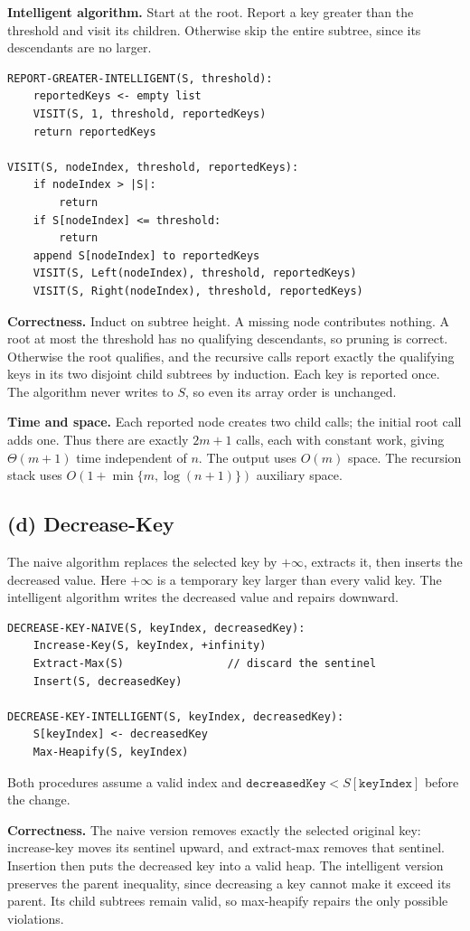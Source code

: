 \documentclass[11pt,a4paper]{article}
\newcommand{\parttitle}[1]{\Needspace{10\baselineskip}\subsection*{#1}}
\begin{document}
\textbf{Intelligent algorithm.} Start at the root. Report a key greater than the threshold and visit its children. Otherwise skip the entire subtree, since its descendants are no larger.
\begin{lstlisting}
REPORT-GREATER-INTELLIGENT(S, threshold):
    reportedKeys <- empty list
    VISIT(S, 1, threshold, reportedKeys)
    return reportedKeys

VISIT(S, nodeIndex, threshold, reportedKeys):
    if nodeIndex > |S|:
        return
    if S[nodeIndex] <= threshold:
        return
    append S[nodeIndex] to reportedKeys
    VISIT(S, Left(nodeIndex), threshold, reportedKeys)
    VISIT(S, Right(nodeIndex), threshold, reportedKeys)
\end{lstlisting}
\textbf{Correctness.} Induct on subtree height. A missing node contributes nothing. A root at most the threshold has no qualifying descendants, so pruning is correct. Otherwise the root qualifies, and the recursive calls report exactly the qualifying keys in its two disjoint child subtrees by induction. Each key is reported once. The algorithm never writes to $S$, so even its array order is unchanged.

\textbf{Time and space.} Each reported node creates two child calls; the initial root call adds one. Thus there are exactly $2m+1$ calls, each with constant work, giving $\boxed{\Theta(m+1)}$ time independent of $n$. The output uses $O(m)$ space. The recursion stack uses $O(1+\min\{m,\log(n+1)\})$ auxiliary space.

\parttitle{(d) Decrease-Key}
The naive algorithm replaces the selected key by $+\infty$, extracts it, then inserts the decreased value. Here $+\infty$ is a temporary key larger than every valid key. The intelligent algorithm writes the decreased value and repairs downward.
\begin{lstlisting}
DECREASE-KEY-NAIVE(S, keyIndex, decreasedKey):
    Increase-Key(S, keyIndex, +infinity)
    Extract-Max(S)                // discard the sentinel
    Insert(S, decreasedKey)

DECREASE-KEY-INTELLIGENT(S, keyIndex, decreasedKey):
    S[keyIndex] <- decreasedKey
    Max-Heapify(S, keyIndex)
\end{lstlisting}
Both procedures assume a valid index and $\mathtt{decreasedKey}<S[\mathtt{keyIndex}]$ before the change.

\textbf{Correctness.} The naive version removes exactly the selected original key: increase-key moves its sentinel upward, and extract-max removes that sentinel. Insertion then puts the decreased key into a valid heap. The intelligent version preserves the parent inequality, since decreasing a key cannot make it exceed its parent. Its child subtrees remain valid, so max-heapify repairs the only possible violations.
\end{document}
